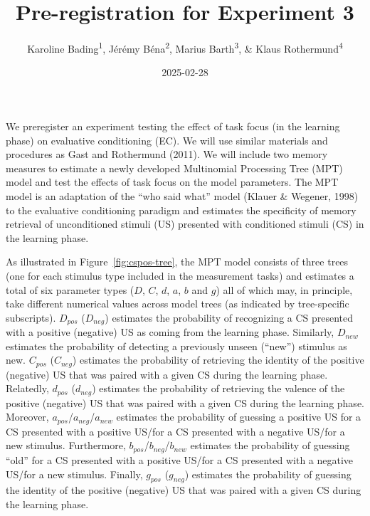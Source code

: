 \documentclass[
  doc,floatsintext]{apa6}
\title{Pre-registration for Experiment 3}
\author{Karoline Bading\textsuperscript{1}, Jérémy Béna\textsuperscript{2}, Marius Barth\textsuperscript{3}, \& Klaus Rothermund\textsuperscript{4}}
\date{2025-02-28}
\affiliation{\vspace{0.5cm}\textsuperscript{1} University of Tübingen\\\textsuperscript{2} Aix-Marseille University\\\textsuperscript{3} University of Cologne\\\textsuperscript{4} Friedrich Schiller University Jena}
\begin{document}
\maketitle

We preregister an experiment testing the effect of task focus (in the learning phase) on evaluative conditioning (EC).
We will use similar materials and procedures as Gast and Rothermund (2011).
We will include two memory measures to estimate a newly developed Multinomial Processing Tree (MPT) model and test the effects of task focus on the model parameters.
The MPT model is an adaptation of the ``who said what'' model (Klauer \& Wegener, 1998) to the evaluative conditioning paradigm and estimates the specificity of memory retrieval of unconditioned stimuli (US) presented with conditioned stimuli (CS) in the learning phase.

As illustrated in Figure~\ref{fig:cspos-tree}, the MPT model consists of three trees (one for each stimulus type included in the measurement tasks) and estimates a total of six parameter types (\(D\), \(C\), \(d\), \(a\), \(b\) and \(g\)) all of which may, in principle, take different numerical values across model trees (as indicated by tree-specific subscripts).
\(D_\mathit{pos}\) (\(D_\mathit{neg}\)) estimates the probability of recognizing a CS presented with a positive (negative) US as coming from the learning phase.
Similarly, \(D_\mathit{new}\) estimates the probability of detecting a previously unseen (``new'') stimulus as new.
\(C_\mathit{pos}\) (\(C_\mathit{neg}\)) estimates the probability of retrieving the identity of the positive (negative) US that was paired with a given CS during the learning phase.
Relatedly, \(d_\mathit{pos}\) (\(d_\mathit{neg}\)) estimates the probability of retrieving the valence of the positive (negative) US that was paired with a given CS during the learning phase.
Moreover, \(a_\mathit{pos}\)/\(a_\mathit{neg}\)/\(a_\mathit{new}\) estimates the probability of guessing a positive US for a CS presented with a positive US/for a CS presented with a negative US/for a new stimulus.
Furthermore, \(b_\mathit{pos}\)/\(b_\mathit{neg}\)/\(b_\mathit{new}\) estimates the probability of guessing ``old'' for a CS presented with a positive US/for a CS presented with a negative US/for a new stimulus.
Finally, \(g_\mathit{pos}\) (\(g_\mathit{neg}\)) estimates the probability of guessing the identity of the positive (negative) US that was paired with a given CS during the learning phase.
\end{document}
